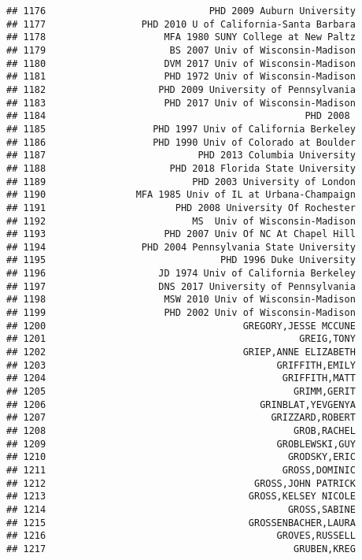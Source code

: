 \documentclass[
]{article}
\begin{document}
\begin{verbatim}
## 1176                             PHD 2009 Auburn University
## 1177                 PHD 2010 U of California-Santa Barbara
## 1178                     MFA 1980 SUNY College at New Paltz
## 1179                      BS 2007 Univ of Wisconsin-Madison
## 1180                     DVM 2017 Univ of Wisconsin-Madison
## 1181                     PHD 1972 Univ of Wisconsin-Madison
## 1182                    PHD 2009 University of Pennsylvania
## 1183                     PHD 2017 Univ of Wisconsin-Madison
## 1184                                              PHD 2008 
## 1185                   PHD 1997 Univ of California Berkeley
## 1186                   PHD 1990 Univ of Colorado at Boulder
## 1187                           PHD 2013 Columbia University
## 1188                      PHD 2018 Florida State University
## 1189                          PHD 2003 University of London
## 1190                MFA 1985 Univ of IL at Urbana-Champaign
## 1191                       PHD 2008 University Of Rochester
## 1192                          MS  Univ of Wisconsin-Madison
## 1193                     PHD 2007 Univ Of NC At Chapel Hill
## 1194                 PHD 2004 Pennsylvania State University
## 1195                               PHD 1996 Duke University
## 1196                    JD 1974 Univ of California Berkeley
## 1197                    DNS 2017 University of Pennsylvania
## 1198                     MSW 2010 Univ of Wisconsin-Madison
## 1199                     PHD 2002 Univ of Wisconsin-Madison
## 1200                                   GREGORY,JESSE MCCUNE
## 1201                                             GREIG,TONY
## 1202                                   GRIEP,ANNE ELIZABETH
## 1203                                         GRIFFITH,EMILY
## 1204                                          GRIFFITH,MATT
## 1205                                            GRIMM,GERIT
## 1206                                      GRINBLAT,YEVGENYA
## 1207                                        GRIZZARD,ROBERT
## 1208                                            GROB,RACHEL
## 1209                                         GROBLEWSKI,GUY
## 1210                                           GRODSKY,ERIC
## 1211                                          GROSS,DOMINIC
## 1212                                     GROSS,JOHN PATRICK
## 1213                                    GROSS,KELSEY NICOLE
## 1214                                           GROSS,SABINE
## 1215                                    GROSSENBACHER,LAURA
## 1216                                         GROVES,RUSSELL
## 1217                                            GRUBEN,KREG

\end{verbatim}
\end{document}
